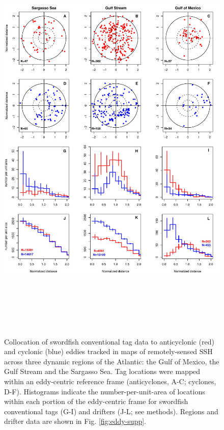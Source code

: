 \begin{figure}[htbp]
\centering
\includegraphics[height=8in, keepaspectratio]{images/C4_Fig5.pdf}
\caption[Collocation of swordfish conventional tag data to anticyclonic and cyclonic eddies across three dynamic regions of the Atlantic]{Collocation of swordfish conventional tag data to anticyclonic (red) and cyclonic (blue) eddies tracked in maps of remotely-sensed SSH across three dynamic regions of the Atlantic: the Gulf of Mexico, the Gulf Stream and the Sargasso Sea. Tag locations were mapped within an eddy-centric reference frame (anticyclones, A-C; cyclones, D-F). Histograms indicate the number-per-unit-area of locations within each portion of the eddy-centric frame for swordfish conventional tags (G-I) and drifters (J-L; see methods). Regions and drifter data are shown in Fig. \ref{fig:eddy-supp}.}
\label{fig:c4f5}
\end{figure}

